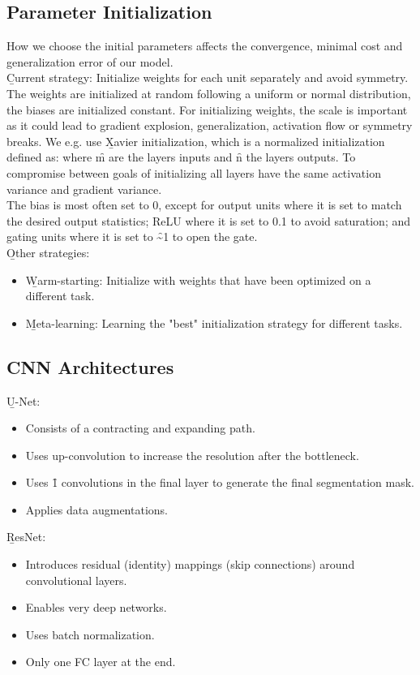 
\subsection{Parameter Initialization}
How we choose the initial parameters affects the convergence, minimal cost and generalization error of our model.\\

\b{Current strategy:} Initialize weights for each unit separately and avoid symmetry. The weights are initialized at random following a uniform or normal distribution, the biases are initialized constant. For initializing weights, the scale is important as it could lead to gradient explosion, generalization, activation flow or symmetry breaks. We e.g. use \b{Xavier initialization}, which is a normalized initialization defined as:
where \f{m} are the layers inputs and \f{n} the layers outputs. To compromise between goals of initializing all layers have the same activation variance and gradient variance.\\
The bias is most often set to 0, except for output units where it is set to match the desired output statistics; ReLU where it is set to 0.1 to avoid saturation; and gating units where it is set to \f{\sim 1} to open the gate.\\

\b{Other strategies:}
\begin{itemize}
    \item \b{Warm-starting:} Initialize with weights that have been optimized on a different task.
    \item \b{Meta-learning:} Learning the "best" initialization strategy for different tasks.
\end{itemize}

\subsection{CNN Architectures}
\b{U-Net:}
\begin{itemize}
    \item Consists of a contracting and expanding path.
    \item Uses up-convolution to increase the resolution after the bottleneck.
    \item Uses \f{1} convolutions in the final layer to generate the final segmentation mask.
    \item Applies data augmentations.
\end{itemize}

\b{ResNet:}
\begin{itemize}
    \item Introduces residual (identity) mappings (skip connections) around convolutional layers.
    \item Enables very deep networks.
    \item Uses batch normalization.
    \item Only one FC layer at the end.
\end{itemize}
